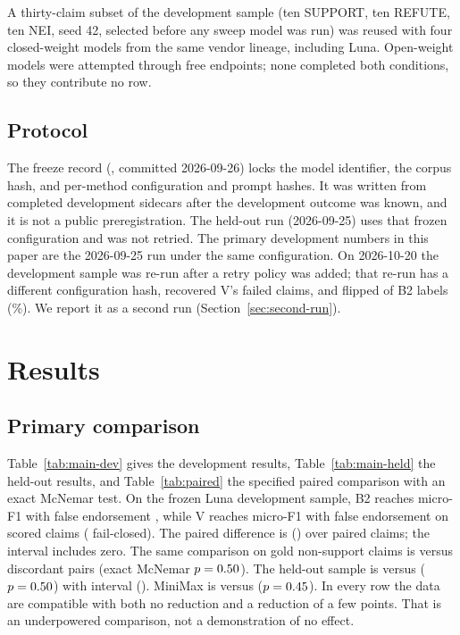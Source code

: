\documentclass[11pt,a4paper]{article}
\begin{document}
A thirty-claim subset of the development sample (ten SUPPORT, ten REFUTE,
ten NEI, seed 42, selected before any sweep model was run) was reused
with four closed-weight models from the same vendor lineage, including
Luna. Open-weight models were attempted through free endpoints; none
completed both conditions, so they contribute no row.

\subsection{Protocol}

The freeze record (, committed 2026-09-26) locks
the model identifier, the corpus hash, and per-method configuration and
prompt hashes. It was written from completed development sidecars after
the development outcome was known, and it is not a public
preregistration. The held-out run (2026-09-25) uses that frozen
configuration and was not retried. The primary development numbers in
this paper are the 2026-09-25 run under the same configuration. On
2026-10-20 the development sample was re-run after a retry policy was
added; that re-run has a different configuration hash, recovered V's
\lunadevVfailclosed{} failed claims, and flipped
\lunaflipsBTwo{} of \lunaflipsBTwon{} B2 labels
(\lunaflipsBTwopct{}\%). We report it as a second run
(Section~\ref{sec:second-run}).

\section{Results}

\subsection{Primary comparison}

Table~\ref{tab:main-dev} gives the development results,
Table~\ref{tab:main-held} the held-out results, and
Table~\ref{tab:paired} the specified paired comparison with an exact
McNemar test. On the frozen Luna development sample, B2 reaches micro-F1
\lunadevBTwomicroFOne{} with false endorsement \lunadevBTwofe{}, while V
reaches micro-F1 \lunadevVmicroFOne{} with false endorsement
\lunadevVfe{} on \lunadevVn{} scored claims
(\lunadevVfailclosed{} fail-closed). The paired difference is
\lunadevfediff{} (\lunadevfeci{}) over \lunadevnpaired{} paired claims;
the interval includes zero. The same comparison on
\lunadevnnonsup{} gold non-support claims is
\lunadevdiscBTwo{} versus \lunadevdiscV{} discordant pairs (exact
McNemar $p=0.50{}$). The held-out sample is
\lunahelddiscBTwo{} versus \lunahelddiscV{}
($p=0.50{}$) with interval \lunaheldfediff{}
(\lunaheldfeci{}). MiniMax is \mmdevdiscBTwo{} versus
\mmdevdiscV{} ($p=0.45{}$). In every row the data are
compatible with both no reduction and a reduction of a few points. That
is an underpowered comparison, not a demonstration of no effect.
\end{document}
